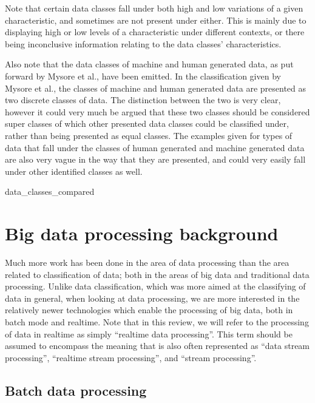 Note that certain data classes fall under both high and low variations of a given characteristic, and sometimes are
not present under either. This is mainly due to displaying high or low levels of a characteristic under different
contexts, or there being inconclusive information relating to the data classes' characteristics.

Also note that the data classes of machine and human generated data, as put forward by Mysore et al.\cite{ibm_big_2013},
have been emitted. In the classification given by Mysore et al., the classes of machine and
human generated data are presented as two discrete classes of data. The distinction between the two is very clear,
however it could very much be argued that these two classes should be considered super classes of which other presented
data classes could be classified under, rather than being presented as equal classes. The examples given for types of
data that fall under the classes of human generated and
machine generated data are also very vague in the way that they are presented, and could very easily fall under other
identified classes as well.

{data_classes_compared}



\newpage

\section{Big data processing background} %
\label{sec:big_data_processing_background}

Much more work has been done in the area of data processing than the area related to classification of data; both in the
areas of big data and traditional data processing. Unlike data classification, which was more aimed at the classifying
of data in general, when looking at data processing, we are more interested in the relatively newer technologies which
enable the processing of big data, both in batch mode and realtime. Note that in this review, we will refer to the
processing of data in realtime as simply ``realtime data processing''. This term should be assumed to encompass the
meaning that is also often represented as ``data stream processing'', ``realtime stream processing'', and ``stream
processing''.

\subsection{Batch data processing} %
\label{sub:batch_data_processing}

